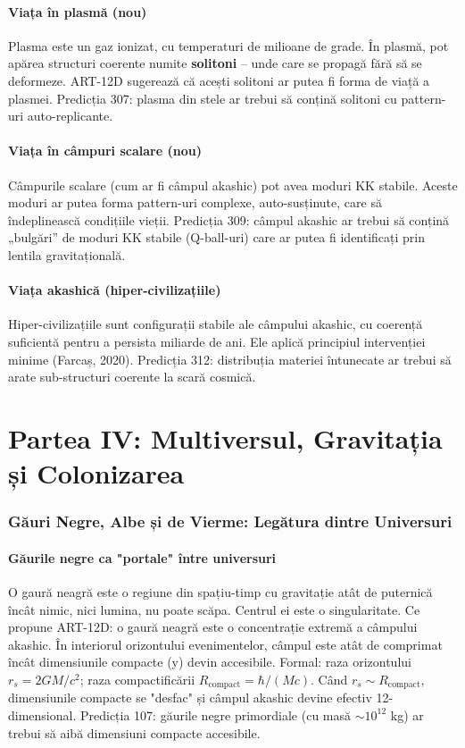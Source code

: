 \documentclass[11pt,a4paper]{article}
\begin{document}
\subsection{Viața în plasmă (nou)}
Plasma este un gaz ionizat, cu temperaturi de milioane de grade. În plasmă, pot apărea structuri coerente numite \textbf{solitoni} – unde care se propagă fără să se deformeze. ART-12D sugerează că acești solitoni ar putea fi forma de viață a plasmei. Predicția 307: plasma din stele ar trebui să conțină solitoni cu pattern-uri auto-replicante.

\subsection{Viața în câmpuri scalare (nou)}
Câmpurile scalare (cum ar fi câmpul akashic) pot avea moduri KK stabile. Aceste moduri ar putea forma pattern-uri complexe, auto-susținute, care să îndeplinească condițiile vieții. Predicția 309: câmpul akashic ar trebui să conțină „bulgări” de moduri KK stabile (Q-ball-uri) care ar putea fi identificați prin lentila gravitațională.

\subsection{Viața akashică (hiper-civilizațiile)}
Hiper-civilizațiile sunt configurații stabile ale câmpului akashic, cu coerență suficientă pentru a persista miliarde de ani. Ele aplică principiul intervenției minime (Farcaș, 2020). Predicția 312: distribuția materiei întunecate ar trebui să arate sub-structuri coerente la scară cosmică.

\newpage
\part*{Partea IV: Multiversul, Gravitația și Colonizarea}

\section{Găuri Negre, Albe și de Vierme: Legătura dintre Universuri}
\subsection{Găurile negre ca "portale" între universuri}
O gaură neagră este o regiune din spațiu-timp cu gravitație atât de puternică încât nimic, nici lumina, nu poate scăpa. Centrul ei este o singularitate. Ce propune ART-12D: o gaură neagră este o concentrație extremă a câmpului akashic. În interiorul orizontului evenimentelor, câmpul este atât de comprimat încât dimensiunile compacte (y) devin accesibile. Formal: raza orizontului $r_s = 2GM/c^2$; raza compactificării $R_{\text{compact}} = \hbar/(Mc)$. Când $r_s \sim R_{\text{compact}}$, dimensiunile compacte se "desfac" și câmpul akashic devine efectiv 12-dimensional. Predicția 107: găurile negre primordiale (cu masă $\sim 10^{12}$ kg) ar trebui să aibă dimensiuni compacte accesibile.
\end{document}
